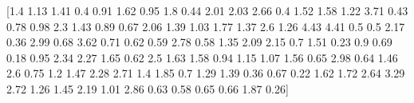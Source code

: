 \documentclass[preview]{standalone}
\begin{document}
\begin{center}
[1.4  1.13 1.41 0.4  0.91 1.62 0.95 1.8  0.44 2.01 2.03 2.66 0.4  1.52
 1.58 1.22 3.71 0.43 0.78 0.98 2.3  1.43 0.89 0.67 2.06 1.39 1.03 1.77
 1.37 2.6  1.26 4.43 4.41 0.5  0.5  2.17 0.36 2.99 0.68 3.62 0.71 0.62
 0.59 2.78 0.58 1.35 2.09 2.15 0.7  1.51 0.23 0.9  0.69 0.18 0.95 2.34
 2.27 1.65 0.62 2.5  1.63 1.58 0.94 1.15 1.07 1.56 0.65 2.98 0.64 1.46
 2.6  0.75 1.2  1.47 2.28 2.71 1.4  1.85 0.7  1.29 1.39 0.36 0.67 0.22
 1.62 1.72 2.64 3.29 2.72 1.26 1.45 2.19 1.01 2.86 0.63 0.58 0.65 0.66
 1.87 0.26]
\end{center}
\end{document}
